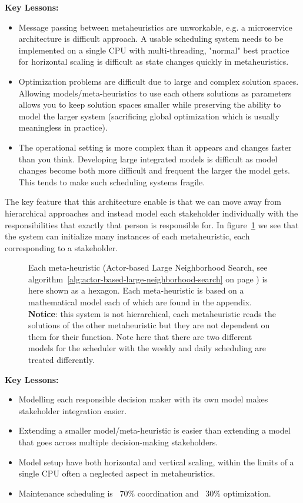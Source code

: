 \textbf{Key Lessons:}
\begin{itemize}[leftmargin=*, labelsep=0.5em]
	\item Message passing between metaheuristics are unworkable, e.g. a microservice
		architecture is difficult approach. A usable scheduling system needs to
		be implemented on a single CPU with multi-threading, "normal" best practice for
		horizontal scaling is difficult as state changes quickly in metaheuristics.  	
	\item Optimization problems are difficult due to large and complex solution
		spaces. Allowing models/meta-heuristics to use each others solutions as
		parameters allows you to keep solution spaces smaller while preserving the
		ability to model the larger system (sacrificing global optimization which
		is usually meaningless in practice). 	
	\item The operational setting is more
		complex than it appears and changes faster than you think. Developing large
		integrated models is difficult as model changes become both more difficult
		and frequent the larger the model gets. This tends to make such scheduling
		systems fragile.
\end{itemize}

The key feature that this architecture enable is that we can move away from hierarchical approaches and 
instead model each stakeholder individually with the responsibilities that exactly that person is responsible 
for. In figure~\ref{fig:model-setup:hexagon} we see that the system can initialize many instances of each metaheuristic, each corresponding to a stakeholder. 

\begin{figure}[H]
	
	\centering
	\drawModelSetupHexagon
	\caption{
		Each meta-heuristic (Actor-based Large Neighborhood Search, see algorithm~\ref{alg:actor-based-large-neighborhood-search} on page \pageref{alg:actor-based-large-neighborhood-search}) is here shown as a hexagon.
		Each meta-heuristic is based on a mathematical model each of which are found in the appendix. \textbf{Notice}: this system is not 
		hierarchical, each metaheuristic reads the solutions of the other metaheuristic but they are not dependent on them for their 
		function. Note here that there are two different models for the scheduler with the weekly and daily scheduling are treated differently.
	}
	\label{fig:model-setup:hexagon}
\end{figure}

\textbf{Key Lessons:}
\begin{itemize}
	\item Modelling each responsible decision maker with its own model makes stakeholder integration easier.
	\item Extending a smaller model/meta-heuristic is easier than extending a model that goes across multiple decision-making stakeholders.
	\item Model setup have both horizontal and vertical scaling, within the limits of a single CPU often a neglected aspect in metaheuristics. 
	\item Maintenance scheduling is ~70\% coordination and ~30\% optimization.
\end{itemize}

